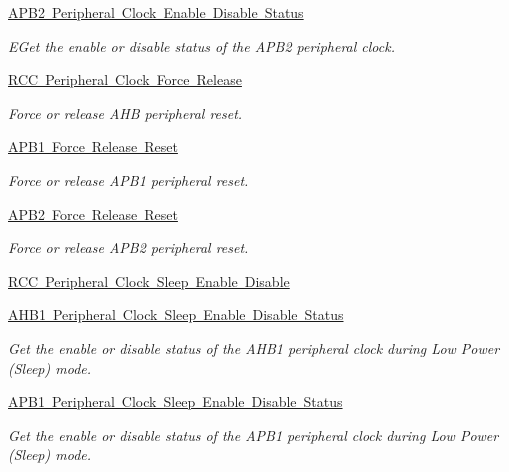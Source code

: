\begin{DoxyCompactItemize}
\mbox{\hyperlink{group___r_c_c___a_p_b2___clock___enable___disable___status}{A\+P\+B2 Peripheral Clock Enable Disable Status}}
\begin{DoxyCompactList}\small\item\em E\+Get the enable or disable status of the A\+P\+B2 peripheral clock. \end{DoxyCompactList}\item 
\mbox{\hyperlink{group___r_c_c___peripheral___clock___force___release}{R\+C\+C Peripheral Clock Force Release}}
\begin{DoxyCompactList}\small\item\em Force or release A\+HB peripheral reset. \end{DoxyCompactList}\item 
\mbox{\hyperlink{group___r_c_c___a_p_b1___force___release___reset}{A\+P\+B1 Force Release Reset}}
\begin{DoxyCompactList}\small\item\em Force or release A\+P\+B1 peripheral reset. \end{DoxyCompactList}\item 
\mbox{\hyperlink{group___r_c_c___a_p_b2___force___release___reset}{A\+P\+B2 Force Release Reset}}
\begin{DoxyCompactList}\small\item\em Force or release A\+P\+B2 peripheral reset. \end{DoxyCompactList}\item 
\mbox{\hyperlink{group___r_c_c___peripheral___clock___sleep___enable___disable}{R\+C\+C Peripheral Clock Sleep Enable Disable}}
\item 
\mbox{\hyperlink{group___r_c_c___a_h_b1___clock___sleep___enable___disable___status}{A\+H\+B1 Peripheral Clock Sleep Enable Disable Status}}
\begin{DoxyCompactList}\small\item\em Get the enable or disable status of the A\+H\+B1 peripheral clock during Low Power (Sleep) mode. \end{DoxyCompactList}\item 
\mbox{\hyperlink{group___r_c_c___a_p_b1___clock___sleep___enable___disable___status}{A\+P\+B1 Peripheral Clock Sleep Enable Disable Status}}
\begin{DoxyCompactList}\small\item\em Get the enable or disable status of the A\+P\+B1 peripheral clock during Low Power (Sleep) mode. \end{DoxyCompactList}\item 

\end{DoxyCompactItemize}
